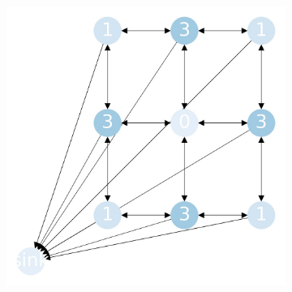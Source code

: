 \documentclass{beamer}
\begin{document}
\begin{frame}
\begin{figure}[h!]
\begin{subfigure}[b]{0.4\linewidth}
      \includegraphics[width=\linewidth]{sandpile_chip_fire_1}
    \end{subfigure}
  \end{figure}
\end{frame}
\end{document}
